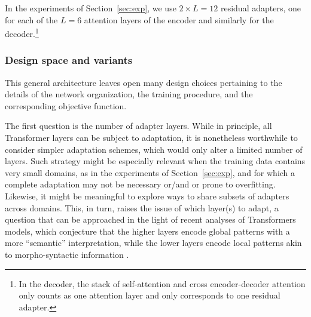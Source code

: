 \documentclass[11pt,a4paper]{article}
\newcommand{\fyTodo}[1]{\Todo[FY:]{\textcolor{orange}{#1}}}
\newcommand{\domain}[1]{\texttt{\textsc{#1}}}
\begin{document}
In the experiments of Section~\ref{sec:exp}, we use $2\times{}L=12$ residual adapters, one for each of the $L=6$ attention layers of the encoder and similarly for the decoder.\footnote{In the decoder, the stack of self-attention and cross encoder-decoder attention only counts as one attention layer and only corresponds to one residual adapter.}

\subsubsection{Design space and variants \label{sssec:design-space}}
This general architecture leaves open many design choices pertaining to the details of the network organization, the training procedure, and the corresponding objective function.

The first question is the number of adapter layers. While in principle, all Transformer layers can be subject to adaptation, it is nonetheless worthwhile to consider simpler adaptation schemes, which would only alter a limited number of layers. Such strategy might be especially relevant when the training data contains very small domains, as in the experiments of Section~\ref{sec:exp}, and for which a complete adaptation may not be necessary or/and or prone to overfitting. Likewise, it might be meaningful to explore ways to share subsets of adapters across domains. This, in turn, raises the issue of which layer(s) to adapt, a question that can be approached in the light of recent analyses of Transformers models, which conjecture that the higher layers encode global patterns with a more ``semantic'' interpretation, while the lower layers encode local patterns akin to morpho-syntactic information \cite{raganato18analysis}.

\end{document}
